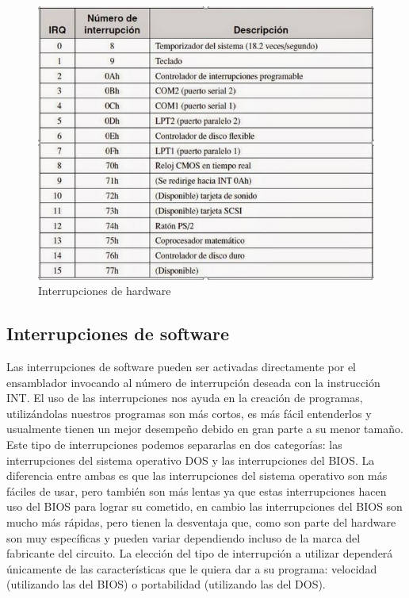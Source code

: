 \documentclass{article}
\begin{document}
\begin{figure}[h]
\centering
\includegraphics[scale=0.7]{interrupciones}
\caption{Interrupciones de hardware \cite{interHS}}
\label{fig:interrupciones}
\end{figure}

\subsection{Interrupciones de software}
Las interrupciones de software pueden ser activadas directamente por el ensamblador invocando al número de interrupción deseada con la instrucción INT\cite{int}.
El uso de las interrupciones nos ayuda en la creación de programas, utilizándolas nuestros programas son más cortos, es más fácil entenderlos y usualmente tienen un mejor desempeño debido en gran parte a su menor tamaño.
Este tipo de interrupciones podemos separarlas en dos categorías: las interrupciones del sistema operativo DOS y las interrupciones del BIOS.
La diferencia entre ambas es que las interrupciones del sistema operativo son más fáciles de usar, pero también son más lentas ya que estas interrupciones hacen uso del BIOS para lograr su cometido, en cambio las interrupciones del BIOS son mucho más rápidas, pero tienen la desventaja que, como son parte del hardware son muy específicas y pueden variar dependiendo incluso de la marca del fabricante del circuito.
La elección del tipo de interrupción a utilizar dependerá únicamente de las características que le quiera dar a su programa: velocidad (utilizando las del BIOS) o portabilidad (utilizando las del DOS).
\end{document}

